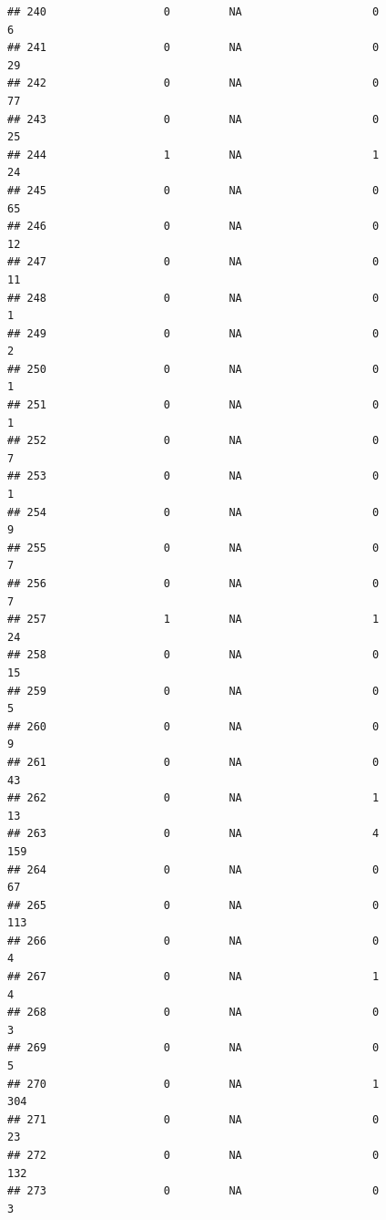 \documentclass[
]{article}
\begin{document}
\begin{verbatim}
## 240                  0         NA                    0                  6
## 241                  0         NA                    0                 29
## 242                  0         NA                    0                 77
## 243                  0         NA                    0                 25
## 244                  1         NA                    1                 24
## 245                  0         NA                    0                 65
## 246                  0         NA                    0                 12
## 247                  0         NA                    0                 11
## 248                  0         NA                    0                  1
## 249                  0         NA                    0                  2
## 250                  0         NA                    0                  1
## 251                  0         NA                    0                  1
## 252                  0         NA                    0                  7
## 253                  0         NA                    0                  1
## 254                  0         NA                    0                  9
## 255                  0         NA                    0                  7
## 256                  0         NA                    0                  7
## 257                  1         NA                    1                 24
## 258                  0         NA                    0                 15
## 259                  0         NA                    0                  5
## 260                  0         NA                    0                  9
## 261                  0         NA                    0                 43
## 262                  0         NA                    1                 13
## 263                  0         NA                    4                159
## 264                  0         NA                    0                 67
## 265                  0         NA                    0                113
## 266                  0         NA                    0                  4
## 267                  0         NA                    1                  4
## 268                  0         NA                    0                  3
## 269                  0         NA                    0                  5
## 270                  0         NA                    1                304
## 271                  0         NA                    0                 23
## 272                  0         NA                    0                132
## 273                  0         NA                    0                  3

\end{verbatim}
\end{document}
